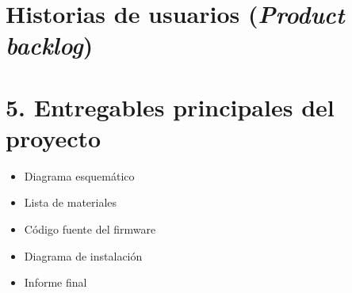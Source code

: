 \documentclass[11pt]{charter}
\begin{document}
\section{Historias de usuarios (\textit{Product backlog})}
\label{sec:backlog}

\section{5. Entregables principales del proyecto}
\label{sec:entregables}
\begin{itemize}
\item Diagrama esquemático
\item Lista de materiales
\item Código fuente del firmware
\item Diagrama de instalación
\item Informe final
\end{itemize}

\end{document}
